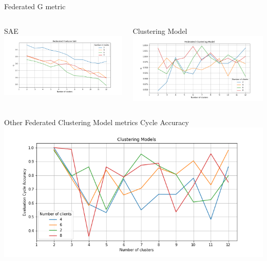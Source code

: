 \documentclass{beamer}
\begin{document}
\begin{frame}{Federated G metric}
\begin{minipage}[\textheight]{\textwidth}
\begin{columns}[T]
	\begin{column}{0.6\textwidth}
	SAE
	\centering
	\includegraphics[width=\textwidth, keepaspectratio]{./images/fed_Finetune_SAE_G_metric.png}
	\end{column}
	\begin{column}{0.6\textwidth}
	Clustering Model
	\centering
	\includegraphics[width=\textwidth, keepaspectratio]{./images/fed_Clustering_Model_G_metric.png}
	\end{column}
\end{columns}
\end{minipage}
\end{frame}

\begin{frame}{Other Federated Clustering Model metrics}
	Cycle Accuracy
	\centering
	\includegraphics[width=\textwidth, keepaspectratio]{./images/fed_clustering_cycle_acc_metric.png}
\end{frame}
\end{document}
